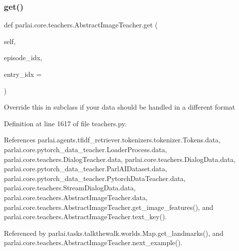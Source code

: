 \subsubsection{\texorpdfstring{get()}{get()}}
{\footnotesize\ttfamily def parlai.\+core.\+teachers.\+Abstract\+Image\+Teacher.\+get (\begin{DoxyParamCaption}\item[{}]{self,  }\item[{}]{episode\+\_\+idx,  }\item[{}]{entry\+\_\+idx = {} }\end{DoxyParamCaption})}

\begin{DoxyVerb}Override this in subclass if your data should be handled in a
different format
\end{DoxyVerb}
 

Definition at line 1617 of file teachers.\+py.



References parlai.\+agents.\+tfidf\+\_\+retriever.\+tokenizers.\+tokenizer.\+Tokens.\+data, parlai.\+core.\+pytorch\+\_\+data\+\_\+teacher.\+Loader\+Process.\+data, parlai.\+core.\+teachers.\+Dialog\+Teacher.\+data, parlai.\+core.\+teachers.\+Dialog\+Data.\+data, parlai.\+core.\+pytorch\+\_\+data\+\_\+teacher.\+Parl\+A\+I\+Dataset.\+data, parlai.\+core.\+pytorch\+\_\+data\+\_\+teacher.\+Pytorch\+Data\+Teacher.\+data, parlai.\+core.\+teachers.\+Stream\+Dialog\+Data.\+data, parlai.\+core.\+teachers.\+Abstract\+Image\+Teacher.\+data, parlai.\+core.\+teachers.\+Abstract\+Image\+Teacher.\+get\+\_\+image\+\_\+features(), and parlai.\+core.\+teachers.\+Abstract\+Image\+Teacher.\+text\+\_\+key().



Referenced by parlai.\+tasks.\+talkthewalk.\+worlds.\+Map.\+get\+\_\+landmarks(), and parlai.\+core.\+teachers.\+Abstract\+Image\+Teacher.\+next\+\_\+example().

